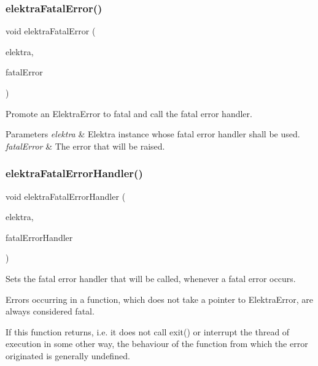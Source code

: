 \subsubsection{\texorpdfstring{elektra\+Fatal\+Error()}{elektraFatalError()}}
{\footnotesize\ttfamily void elektra\+Fatal\+Error (\begin{DoxyParamCaption}\item[{Elektra $\ast$}]{elektra,  }\item[{Elektra\+Error $\ast$}]{fatal\+Error }\end{DoxyParamCaption})}



Promote an Elektra\+Error to fatal and call the fatal error handler. 


\begin{DoxyParams}{Parameters}
{\em elektra} & Elektra instance whose fatal error handler shall be used. \\
\hline
{\em fatal\+Error} & The error that will be raised. \\
\hline
\end{DoxyParams}
\mbox{\label{group__highlevel_ga496441e9e1dd80ed14a239dfc4c08c40}} 
\subsubsection{\texorpdfstring{elektra\+Fatal\+Error\+Handler()}{elektraFatalErrorHandler()}}
{\footnotesize\ttfamily void elektra\+Fatal\+Error\+Handler (\begin{DoxyParamCaption}\item[{Elektra $\ast$}]{elektra,  }\item[{Elektra\+Error\+Handler}]{fatal\+Error\+Handler }\end{DoxyParamCaption})}



Sets the fatal error handler that will be called, whenever a fatal error occurs. 

Errors occurring in a function, which does not take a pointer to Elektra\+Error, are always considered fatal.

If this function returns, i.\+e. it does not call exit() or interrupt the thread of execution in some other way, the behaviour of the function from which the error originated is generally undefined.


